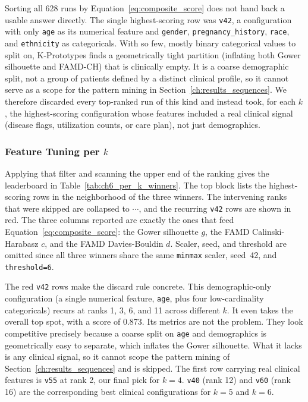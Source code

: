 Sorting all 628 runs by Equation~\eqref{eq:composite_score} does not hand back a usable answer directly. The single highest-scoring row was \texttt{v42}, a configuration with only \texttt{age} as its numerical feature and \texttt{gender}, \texttt{pregnancy\_history}, \texttt{race}, and \texttt{ethnicity} as categoricals. With so few, mostly binary categorical values to split on, K-Prototypes finds a geometrically tight partition (inflating both Gower silhouette and FAMD-CH) that is clinically empty. It is a coarse demographic split, not a group of patients defined by a distinct clinical profile, so it cannot serve as a scope for the pattern mining in Section~\ref{ch:results_sequences}. We therefore discarded every top-ranked run of this kind and instead took, for each $k$, the highest-scoring configuration whose features included a real clinical signal (disease flags, utilization counts, or care plan), not just demographics.

\subsubsection*{Feature Tuning per $k$}

Applying that filter and scanning the upper end of the ranking gives the leaderboard in Table~\ref{tab:ch6_per_k_winners}. The top block lists the highest-scoring rows in the neighborhood of the three winners. The intervening ranks that were skipped are collapsed to $\cdots$, and the recurring \texttt{v42} rows are shown in red. The three columns reported are exactly the ones that feed Equation~\eqref{eq:composite_score}: the Gower silhouette $g$, the FAMD Calinski-Harabasz $c$, and the FAMD Davies-Bouldin $d$. Scaler, seed, and threshold are omitted since all three winners share the same \texttt{minmax} scaler, seed~42, and \texttt{threshold=6}.

The red \texttt{v42} rows make the discard rule concrete. This demographic-only configuration (a single numerical feature, \texttt{age}, plus four low-cardinality categoricals) recurs at ranks 1, 3, 6, and 11 across different $k$. It even takes the overall top spot, with a score of 0.873. Its metrics are not the problem. They look competitive precisely because a coarse split on \texttt{age} and demographics is geometrically easy to separate, which inflates the Gower silhouette. What it lacks is any clinical signal, so it cannot scope the pattern mining of Section~\ref{ch:results_sequences} and is skipped. The first row carrying real clinical features is \texttt{v55} at rank 2, our final pick for $k{=}4$. \texttt{v40} (rank 12) and \texttt{v60} (rank 16) are the corresponding best clinical configurations for $k{=}5$ and $k{=}6$.

